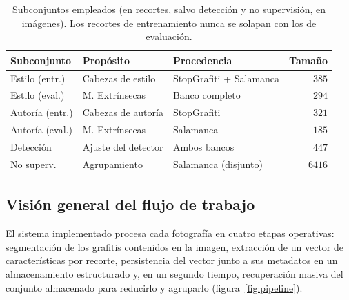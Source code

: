 \begin{table}[h!]
  \caption[Subconjuntos etiquetados empleados]{Subconjuntos empleados (en recortes, salvo detección y no
  supervisión, en imágenes). Los recortes de entrenamiento nunca se solapan con
  los de evaluación.}
  \label{tab:subconjuntos}
  \centering
  \begin{tabular}{|l|l|l|r|} \hline
    \textbf{Subconjunto} & \textbf{Propósito} & \textbf{Procedencia} & \textbf{Tamaño} \\ \hline
    Estilo (entr.) & Cabezas de estilo & StopGrafiti + Salamanca & $385$ \\ \hline
    Estilo (eval.) & M. Extrínsecas & Banco completo & $294$ \\ \hline
    Autoría (entr.) & Cabezas de autoría & StopGrafiti & $321$ \\ \hline
    Autoría (eval.) & M. Extrínsecas & Salamanca & $185$ \\ \hline
    Detección & Ajuste del detector & Ambos bancos & $447$ \\ \hline
    No superv. & Agrupamiento & Salamanca (disjunto) & $6416$ \\ \hline
  \end{tabular}
\end{table}

\subsection{Visión general del flujo de trabajo}
\label{subsec:vision}
El sistema implementado procesa cada fotografía en cuatro etapas operativas:
segmentación de los grafitis contenidos en la imagen, extracción de un vector
de características por recorte, persistencia del vector junto a sus metadatos
en un almacenamiento estructurado y, en un segundo tiempo, recuperación masiva
del conjunto almacenado para reducirlo y agruparlo (figura~\ref{fig:pipeline}).

